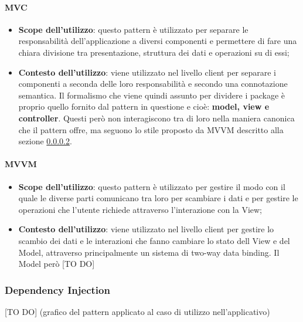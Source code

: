 		\paragraph{MVC} %
		\label{par:mvc}
			\begin{itemize}
				\item \textbf{Scope dell'utilizzo}: questo pattern è utilizzato per separare le responsabilità dell’applicazione a diversi componenti e permettere di fare una chiara divisione tra presentazione, struttura dei dati e operazioni su di essi;

				\item \textbf{Contesto dell'utilizzo}: viene utilizzato nel livello client per separare i componenti a seconda delle loro responsabilità e secondo una connotazione semantica. Il formalismo che viene quindi assunto per dividere i package è proprio quello fornito dal pattern in questione e cioè: \textbf{model, view e controller}. Questi però non interagiscono tra di loro nella maniera canonica che il pattern offre, ma seguono lo stile proposto da MVVM descritto alla sezione \ref{par:mvvm}.
			\end{itemize}

		\paragraph{MVVM} %
		\label{par:mvvm}
			\begin{itemize}
				\item \textbf{Scope dell'utilizzo}: questo pattern è utilizzato per gestire il modo con il quale le diverse parti comunicano tra loro per scambiare i dati e per gestire le operazioni che l'utente richiede attraverso l'interazione con la View;

				\item \textbf{Contesto dell'utilizzo}: viene utilizzato nel livello client per gestire lo scambio dei dati e le interazioni che fanno cambiare lo stato dell View e del Model, attraverso principalmente un sistema di two-way data binding. Il Model però [TO DO]
			\end{itemize}

	\subsubsection{Dependency Injection} %
	\label{ssub:dependency_injection}
	[TO DO] (grafico del pattern applicato al caso di utilizzo nell'applicativo)

